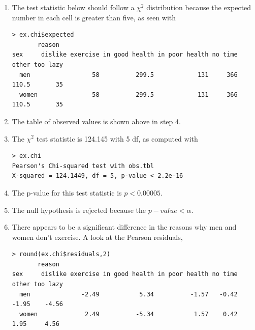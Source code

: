 \documentclass[10pt,openany]{book}\usepackage[]{graphicx}\usepackage[]{color}
\makeatletter
\newenvironment{kframe}{%
 \def\at@end@of@kframe{}%
 \ifinner\ifhmode%
  \def\at@end@of@kframe{\end{minipage}}%
  \begin{minipage}{\columnwidth}%
 \fi\fi%
 \def\FrameCommand##1{\hskip\@totalleftmargin \hskip-\fboxsep
 \colorbox{shadecolor}{##1}\hskip-\fboxsep
     \hskip-\linewidth \hskip-\@totalleftmargin \hskip\columnwidth}%
 \MakeFramed {\advance\hsize-\width
   \@totalleftmargin\z@ \linewidth\hsize
   \@setminipage}}%
 {\par\unskip\endMakeFramed%
 \at@end@of@kframe}
\newenvironment{knitrout}{}{} %
\makeatother
\begin{document}
\begin{itemize}
\begin{enumerate}
\begin{knitrout}
\end{knitrout}
      \item The test statistic below should follow a $\chi^{2}$ distribution because the expected number in each cell is greater than five, as seen with
\begin{knitrout}
\color{fgcolor}\begin{kframe}
\begin{verbatim}
> ex.chi$expected
       reason
sex     dislike exercise in good health in poor health no time other too lazy
  men                 58          299.5            131     366 110.5       35
  women               58          299.5            131     366 110.5       35
\end{verbatim}
\end{kframe}
\end{knitrout}
      \item The table of observed values is shown above in step 4.
      \item The $\chi^{2}$ test statistic is 124.145 with 5 df, as computed with
\begin{knitrout}
\color{fgcolor}\begin{kframe}
\begin{verbatim}
> ex.chi
Pearson's Chi-squared test with obs.tbl 
X-squared = 124.1449, df = 5, p-value < 2.2e-16
\end{verbatim}
\end{kframe}
\end{knitrout}
      \item The p-value for this test statistic is $p<0.00005$.
      \item The null hypothesis is rejected because the $p-value<\alpha$.
      \item There appears to be a significant difference in the reasons why men and women don't exercise.  A look at the Pearson residuals,
\begin{knitrout}
\color{fgcolor}\begin{kframe}
\begin{verbatim}
> round(ex.chi$residuals,2)
       reason
sex     dislike exercise in good health in poor health no time other too lazy
  men              -2.49           5.34          -1.57   -0.42 -1.95    -4.56
  women             2.49          -5.34           1.57    0.42  1.95     4.56
\end{verbatim}
\end{kframe}

\end{knitrout}
\end{enumerate}
\end{itemize}
\end{document}
